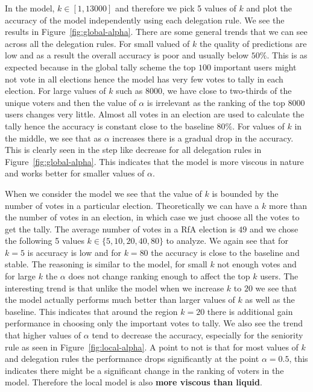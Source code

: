 In the \globalv model, $k \in [1,13000]$ and therefore we pick 5 values of $k$ and plot the accuracy of the model independently using each delegation rule. We see the results in Figure~\ref{fig:global-alpha}. There are some general trends that we can see across all the delegation rules. For small valued of $k$ the quality of predictions are low and as a result the overall accuracy is poor and usually below $50\%$. This is as expected because in the global tally scheme the top $100$ important users might not vote in all elections hence the model has very few votes to tally in each election. For large values of $k$ such as $8000$, we have close to two-thirds of the unique voters and then the value of $\alpha$ is irrelevant as the ranking of the top $8000$ users changes very little. Almost all votes in an election are used to calculate the tally hence the accuracy is constant close to the baseline $80\%$. For values of $k$ in the middle, we see that as $\alpha$ increases there is a gradual drop in the accuracy. This is clearly seen in the step like decrease for all delegation rules in Figure~\ref{fig:global-alpha}. This indicates that the \globalv model is more viscous in nature and works better for smaller values of $\alpha$.

When we consider the \localv model we see that the value of $k$ is bounded by the number of votes in a particular election. Theoretically we can have a $k$ more than the number of votes in an election, in which case we just choose all the votes to get the tally. The average number of votes in a RfA election is $49$ and we chose the following 5 values $k \in \{5,10,20,40,80\}$ to analyze. We again see that for $k=5$ is accuracy is low and for $k=80$ the accuracy is close to the baseline and stable. The reasoning is similar to the \globalv model, for small $k$ not enough votes and for large $k$ the $\alpha$ does not change ranking enough to affect the top $k$ users. The interesting trend is that unlike the \globalv model when we increase $k$ to $20$ we see that the \localv model actually performs much better than larger values of $k$ as well as the baseline. This indicates that around the region $k=20$ there is additional gain performance in choosing only the important votes to tally. We also see the trend that higher values of $\alpha$ tend to decrease the accuracy, especially for the seniority rule as seen in Figure~\ref{fig:local-alpha}. A point to not is that for most values of $k$ and delegation rules the performance drops significantly at the point $\alpha=0.5$, this indicates there might be a significant change in the ranking of voters in the \localv model. Therefore the local model is also \textbf{more viscous than liquid}.

